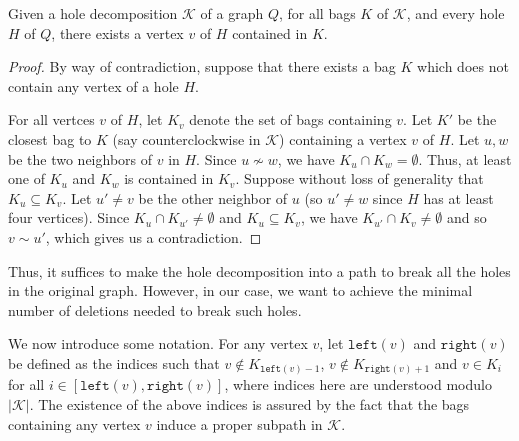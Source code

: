\documentclass{article}
\begin{document}
    \begin{prop} \label{hole prop}
        Given a hole decomposition $\mathcal{K}$ of
        a graph $Q$,
        for all bags $K$ of $\mathcal{K}$,
        and every hole $H$ of $Q$,
        there exists a vertex $v$ 
        of $H$ contained in $K$.
    \end{prop}
    \begin{proof}
        By way of contradiction,
        suppose that there exists a 
        bag $K$ which does not 
        contain any vertex of a hole $H$.
        
        For all vertces $v$ of $H$, 
        let $K_{v}$ denote the
        set of bags containing $v$. 
        Let $K'$ be the closest bag
        to $K$ (say counterclockwise in $\mathcal{K}$)
        containing a vertex $v$ of $H$.
        Let $u, w$ be the two neighbors
        of $v$ in $H$.
        Since $u \not\sim w$, we have
        $K_{u} \cap K_{w} = \emptyset$.
        Thus, at least one of $K_{u}$ 
        and $K_{w}$ is contained
        in $K_{v}$. Suppose
        without loss of generality
        that $K_{u} \subseteq K_{v}$.
        Let $u' \neq v$ be the other
        neighbor of $u$
        (so $u' \neq w$ since $H$ has at 
        least four vertices). Since
        $K_{u} \cap K_{u'} \neq \emptyset$
        and $K_{u} \subseteq K_{v}$,
        we have $K_{u'} \cap K_{v} \neq \emptyset$
        and so $v \sim u'$, which
        gives us a contradiction.
    \end{proof}

    \begin{rmk} \label{hole rmk}
        Thus, it suffices to make the hole
        decomposition
        into a path to break all the holes
        in the original graph.
        However, in our case, we want
        to achieve the 
        minimal number of 
        deletions needed 
        to break such holes.      
    \end{rmk}

    We now introduce some notation.
    For any vertex $v$, let 
    $\texttt{left}\left(v\right)$
    and $\texttt{right}\left(v\right)$ 
    be defined as the indices such that
    $v \not \in K _{\texttt{left}\left(v\right)-1}$,
    $v \not \in K_{\texttt{right}\left(v\right)+1}$ 
    and $v \in K_{i}$ for all 
    $i \in \left[\texttt{left}\left(v\right), \texttt{right}\left(v\right)\right]$,
    where indices here are understood
    modulo $\left|\mathcal{K}\right|$.
    The existence of the
    above indices is
    assured by the fact that 
    the bags containing
    any vertex $v$ induce a proper subpath
    in $\mathcal{K}$.
\end{document}

